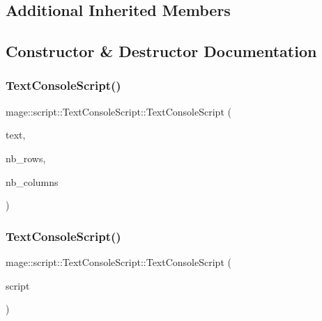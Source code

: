 \subsection*{Additional Inherited Members}


\subsection{Constructor \& Destructor Documentation}
\hypertarget{classmage_1_1script_1_1_text_console_script_afb33cbb74669491151989d957674bca8}{}\label{classmage_1_1script_1_1_text_console_script_afb33cbb74669491151989d957674bca8} 
\subsubsection{\texorpdfstring{Text\+Console\+Script()}{TextConsoleScript()}\hspace{0.1cm}{\footnotesize\ttfamily [1/3]}}
{\footnotesize\ttfamily mage\+::script\+::\+Text\+Console\+Script\+::\+Text\+Console\+Script (\begin{DoxyParamCaption}\item[{\hyperlink{classmage_1_1_sprite_text}{Sprite\+Text} $\ast$}]{text,  }\item[{\hyperlink{namespacemage_a41c104c036fba3756a74e19f793eeaa1}{U32}}]{nb\+\_\+rows,  }\item[{\hyperlink{namespacemage_a41c104c036fba3756a74e19f793eeaa1}{U32}}]{nb\+\_\+columns }\end{DoxyParamCaption})\hspace{0.3cm}{\ttfamily [explicit]}}

\hypertarget{classmage_1_1script_1_1_text_console_script_a6b1085406955c58bac96f798408fb558}{}\label{classmage_1_1script_1_1_text_console_script_a6b1085406955c58bac96f798408fb558} 
\subsubsection{\texorpdfstring{Text\+Console\+Script()}{TextConsoleScript()}\hspace{0.1cm}{\footnotesize\ttfamily [2/3]}}
{\footnotesize\ttfamily mage\+::script\+::\+Text\+Console\+Script\+::\+Text\+Console\+Script (\begin{DoxyParamCaption}\item[{const \hyperlink{classmage_1_1script_1_1_text_console_script}{Text\+Console\+Script} \&}]{script }\end{DoxyParamCaption})\hspace{0.3cm}{\ttfamily [delete]}}


